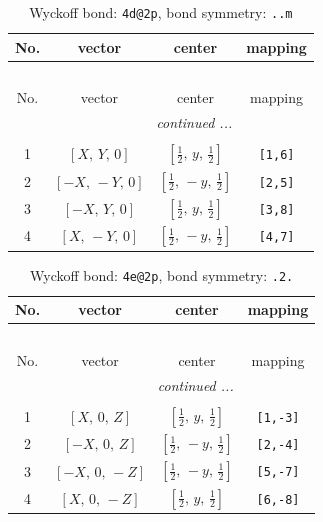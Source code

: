 \documentclass[fleqn,8pt]{jsarticle}
\begin{document}
\begin{longtable}{cccc}
\caption{Wyckoff bond: {\tt 4d@2p}, bond symmetry: {\tt ..m}}
 \\
 \hline \hline
No. & vector & center & mapping \\ \hline \endfirsthead

\multicolumn{3}{l}{\tablename\ \thetable{}} \\
 \hline \hline
No. & vector & center & mapping \\ \hline \endhead

 \hline \hline
\multicolumn{3}{r}{\footnotesize\it continued ...} \\ \endfoot

 \hline \hline
\multicolumn{3}{r}{} \\ \endlastfoot

1 & $\left[ X,\, Y,\, 0 \right]$ & $\left[ \frac{1}{2},\, y,\, \frac{1}{2} \right]$ & {\tt [1,6]} \\ \hline
2 & $\left[ - X,\, - Y,\, 0 \right]$ & $\left[ \frac{1}{2},\, - y,\, \frac{1}{2} \right]$ & {\tt [2,5]} \\ \hline
3 & $\left[ - X,\, Y,\, 0 \right]$ & $\left[ \frac{1}{2},\, y,\, \frac{1}{2} \right]$ & {\tt [3,8]} \\ \hline
4 & $\left[ X,\, - Y,\, 0 \right]$ & $\left[ \frac{1}{2},\, - y,\, \frac{1}{2} \right]$ & {\tt [4,7]} \\
\end{longtable}
\renewcommand{\arraystretch}{1.2}
\begin{longtable}{cccc}
\caption{Wyckoff bond: {\tt 4e@2p}, bond symmetry: {\tt .2.}}
 \\
 \hline \hline
No. & vector & center & mapping \\ \hline \endfirsthead

\multicolumn{3}{l}{\tablename\ \thetable{}} \\
 \hline \hline
No. & vector & center & mapping \\ \hline \endhead

 \hline \hline
\multicolumn{3}{r}{\footnotesize\it continued ...} \\ \endfoot

 \hline \hline
\multicolumn{3}{r}{} \\ \endlastfoot

1 & $\left[ X,\, 0,\, Z \right]$ & $\left[ \frac{1}{2},\, y,\, \frac{1}{2} \right]$ & {\tt [1,-3]} \\ \hline
2 & $\left[ - X,\, 0,\, Z \right]$ & $\left[ \frac{1}{2},\, - y,\, \frac{1}{2} \right]$ & {\tt [2,-4]} \\ \hline
3 & $\left[ - X,\, 0,\, - Z \right]$ & $\left[ \frac{1}{2},\, - y,\, \frac{1}{2} \right]$ & {\tt [5,-7]} \\ \hline
4 & $\left[ X,\, 0,\, - Z \right]$ & $\left[ \frac{1}{2},\, y,\, \frac{1}{2} \right]$ & {\tt [6,-8]} \\
\end{longtable}
\end{document}

